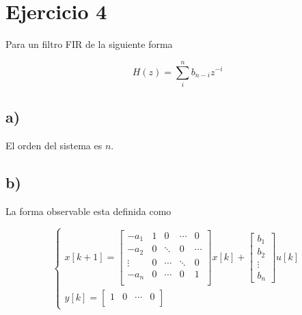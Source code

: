 \documentclass{article}
\newcommand{\syseq}[1]{ \left\{  
                            \begin{array}{c}
                                #1
                            \end{array}
                        \right. }
\begin{document}
    \section{Ejercicio 4}

        Para un filtro FIR de la siguiente forma 

        \begin{equation}
            \label{eq:ej4}
            H(z) = \sum_i^n b_{n-i}z^{-i}
        \end{equation}

        \subsection{a)}

            El orden del sistema es $n$.

        \subsection{b)}

            La forma observable esta definida como 

            \begin{equation}
                \syseq{
                    x[k+1] = 
                        \begin{bmatrix}
                            -a_1 & 1 & 0 & \cdots & 0 \\
                            -a_2 & 0 & \ddots & 0 & \cdots \\
                            \vdots & 0 & \cdots & \ddots & 0\\
                            -a_n & 0 & \cdots & 0 & 1\\
                        \end{bmatrix} x[k] + 
                        \begin{bmatrix}
                            b_1 \\
                            b_2 \\ 
                            \vdots \\ 
                            b_n
                        \end{bmatrix}u[k] \\
                    y[k] = 
                        \begin{bmatrix}
                            1 & 0 & \cdots & 0\\
                        \end{bmatrix}
                }
            \end{equation}
\end{document}

